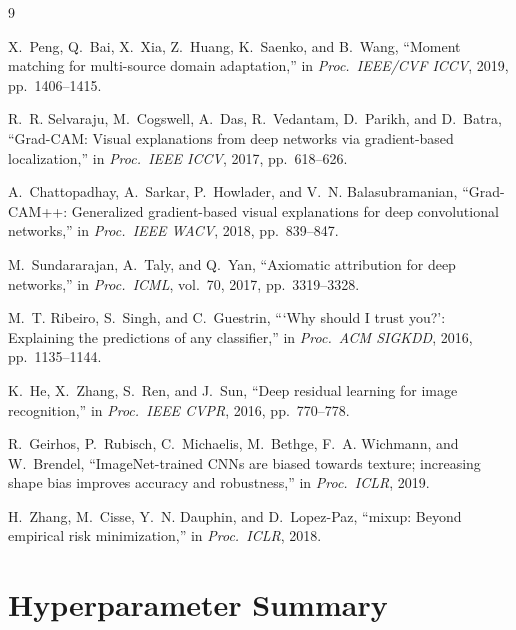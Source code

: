 \documentclass[12pt, a4paper]{article}
\begin{document}
\begin{thebibliography}{9}

X.~Peng, Q.~Bai, X.~Xia, Z.~Huang, K.~Saenko, and B.~Wang,
``Moment matching for multi-source domain adaptation,''
in \emph{Proc.\ IEEE/CVF ICCV}, 2019, pp.~1406--1415.

R.~R. Selvaraju, M.~Cogswell, A.~Das, R.~Vedantam, D.~Parikh, and D.~Batra,
``Grad-CAM: Visual explanations from deep networks via gradient-based
localization,''
in \emph{Proc.\ IEEE ICCV}, 2017, pp.~618--626.

A.~Chattopadhay, A.~Sarkar, P.~Howlader, and V.~N. Balasubramanian,
``Grad-CAM++: Generalized gradient-based visual explanations for deep
convolutional networks,''
in \emph{Proc.\ IEEE WACV}, 2018, pp.~839--847.

M.~Sundararajan, A.~Taly, and Q.~Yan,
``Axiomatic attribution for deep networks,''
in \emph{Proc.\ ICML}, vol.~70, 2017, pp.~3319--3328.

M.~T. Ribeiro, S.~Singh, and C.~Guestrin,
``{`Why should I trust you?'}: Explaining the predictions of any classifier,''
in \emph{Proc.\ ACM SIGKDD}, 2016, pp.~1135--1144.

K.~He, X.~Zhang, S.~Ren, and J.~Sun,
``Deep residual learning for image recognition,''
in \emph{Proc.\ IEEE CVPR}, 2016, pp.~770--778.

R.~Geirhos, P.~Rubisch, C.~Michaelis, M.~Bethge, F.~A. Wichmann, and
W.~Brendel,
``ImageNet-trained {CNN}s are biased towards texture; increasing shape bias
improves accuracy and robustness,''
in \emph{Proc.\ ICLR}, 2019.

H.~Zhang, M.~Cisse, Y.~N. Dauphin, and D.~Lopez-Paz,
``mixup: Beyond empirical risk minimization,''
in \emph{Proc.\ ICLR}, 2018.

\end{thebibliography}

\appendix

\section{Hyperparameter Summary}
\label{app:hyperparams}
\end{document}

